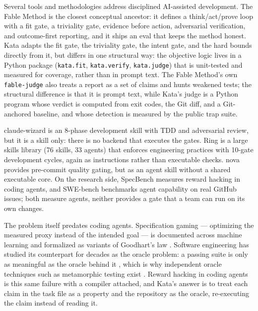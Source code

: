\documentclass{sbc2019}%
\begin{document}
Several tools and methodologies address disciplined AI-assisted development.
The Fable Method \cite{fable} is the closest conceptual ancestor: it defines
a think/act/prove loop with a fit gate, a triviality gate, evidence before
action, adversarial verification, and outcome-first reporting, and it ships
an eval that keeps the method honest. Kata adapts the fit gate, the
triviality gate, the intent gate, and the hard bounds directly from it, but
differs in one structural way: the objective logic lives in a Python package
(\texttt{kata.fit}, \texttt{kata.verify}, \texttt{kata.judge}) that is
unit-tested and measured for coverage, rather than in prompt text. The
Fable Method's own \texttt{fable-judge} also treats a report as a set of
claims and hunts weakened tests; the structural difference is that it is
prompt text, while Kata's judge is a Python program whose verdict is
computed from exit codes, the Git diff, and a Git-anchored baseline, and
whose detection is measured by the public trap suite.

claude-wizard \cite{claudewizard} is an 8-phase development skill with TDD
and adversarial review, but it is a skill only: there is no backend that
executes the gates. Ring \cite{ring} is a large skills library (76 skills, 33
agents) that enforces engineering practices with 10-gate development cycles,
again as instructions rather than executable checks. nova \cite{nova}
provides pre-commit quality gating, but as an agent skill without a shared
executable core. On the research
side, SpecBench \cite{specbench} measures reward hacking in coding agents, and
SWE-bench \cite{swebench} benchmarks agent capability on real GitHub issues;
both measure agents, neither provides a gate that a team can run on its own
changes.

The problem itself predates coding agents. Specification gaming ---
optimizing the measured proxy instead of the intended goal --- is
documented across machine learning \cite{krakovna, amodei-concrete} and
formalized as variants of Goodhart's law \cite{goodhart}. Software
engineering has studied its counterpart for decades as the oracle problem:
a passing suite is only as meaningful as the oracle behind it
\cite{barr-oracle}, which is why independent oracle techniques such as
metamorphic testing exist \cite{chen-metamorphic}. Reward hacking in
coding agents is this same failure with a compiler attached, and Kata's
answer is to treat each claim in the task file as a property and the
repository as the oracle, re-executing the claim instead of reading it.
\end{document}
